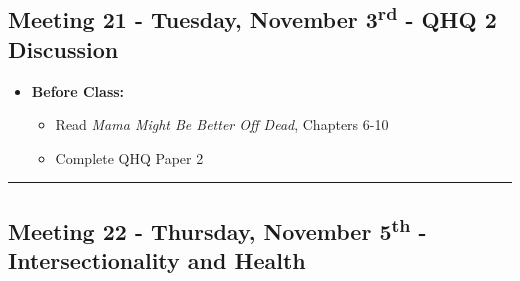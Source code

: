 \documentclass[
]{book}
\providecommand{\tightlist}{%
  \setlength{\itemsep}{0pt}\setlength{\parskip}{0pt}}
\begin{document}
\hypertarget{meeting-21---tuesday-november-3rd---qhq-2-discussion}{%
\subsection*{\texorpdfstring{Meeting 21 - Tuesday, November 3\textsuperscript{rd} - QHQ 2 Discussion}{Meeting 21 - Tuesday, November 3rd - QHQ 2 Discussion}}\label{meeting-21---tuesday-november-3rd---qhq-2-discussion}}

\begin{itemize}
\tightlist
\item
  \textbf{Before Class:}

  \begin{itemize}
  \tightlist
  \item
    Read \emph{Mama Might Be Better Off Dead}, Chapters 6-10
  \item
    Complete QHQ Paper 2
  \end{itemize}
\end{itemize}

\begin{center}\rule{0.5\linewidth}{0.5pt}\end{center}

\hypertarget{meeting-22---thursday-november-5th---intersectionality-and-health}{%
\subsection*{\texorpdfstring{Meeting 22 - Thursday, November 5\textsuperscript{th} - Intersectionality and Health}{Meeting 22 - Thursday, November 5th - Intersectionality and Health}}\label{meeting-22---thursday-november-5th---intersectionality-and-health}}
\end{document}
